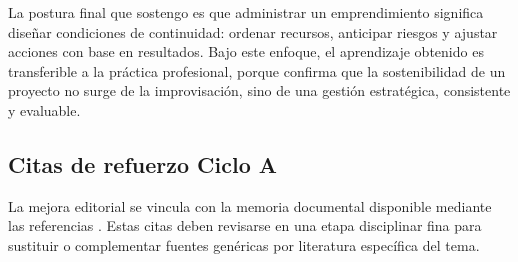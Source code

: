 \documentclass[
	spanish,
	letterpaper, oneside
]{article}
\begin{document}
La postura final que sostengo es que administrar un emprendimiento significa diseñar condiciones de continuidad: ordenar recursos, anticipar riesgos y ajustar acciones con base en resultados. Bajo este enfoque, el aprendizaje obtenido es transferible a la práctica profesional, porque confirma que la sostenibilidad de un proyecto no surge de la improvisación, sino de una gestión estratégica, consistente y evaluable.




\subsection*{Citas de refuerzo Ciclo A}
La mejora editorial se vincula con la memoria documental disponible mediante las referencias \citep{unadm100TecnicasDidacticas2023,cicloARefuerzo02,cicloARefuerzo03,cicloARefuerzo04,cicloARefuerzo05}. Estas citas deben revisarse en una etapa disciplinar fina para sustituir o complementar fuentes genéricas por literatura específica del tema.
\end{document}
